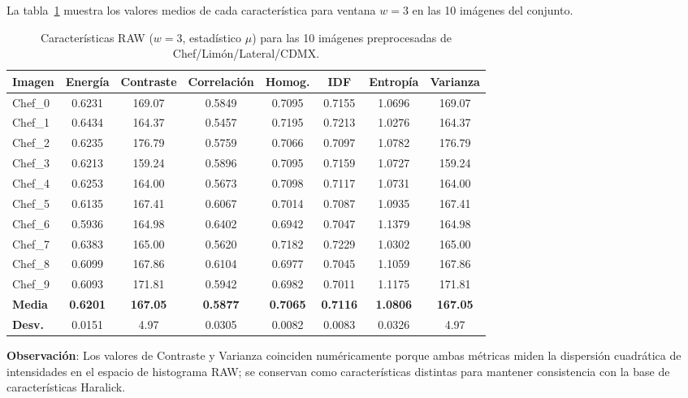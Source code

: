 \documentclass[12pt,a4paper]{article}
\begin{document}
La tabla~\ref{tab:raw_w3} muestra los valores medios de cada
característica para ventana $w=3$ en las 10 imágenes del conjunto.

\begin{table}[H]
\centering
\caption{Características RAW ($w=3$, estadístico $\mu$) para las
         10 imágenes preprocesadas de Chef/Limón/Lateral/CDMX.}
\label{tab:raw_w3}
\setlength{\tabcolsep}{5pt}
\begin{tabular}{@{}lccccccc@{}}
\toprule
\textbf{Imagen} & \textbf{Energía} & \textbf{Contraste} &
  \textbf{Correlación} & \textbf{Homog.} & \textbf{IDF} &
  \textbf{Entropía} & \textbf{Varianza} \\
\midrule
Chef\_0 & 0.6231 & 169.07 & 0.5849 & 0.7095 & 0.7155 & 1.0696 & 169.07 \\
Chef\_1 & 0.6434 & 164.37 & 0.5457 & 0.7195 & 0.7213 & 1.0276 & 164.37 \\
Chef\_2 & 0.6235 & 176.79 & 0.5759 & 0.7066 & 0.7097 & 1.0782 & 176.79 \\
Chef\_3 & 0.6213 & 159.24 & 0.5896 & 0.7095 & 0.7159 & 1.0727 & 159.24 \\
Chef\_4 & 0.6253 & 164.00 & 0.5673 & 0.7098 & 0.7117 & 1.0731 & 164.00 \\
Chef\_5 & 0.6135 & 167.41 & 0.6067 & 0.7014 & 0.7087 & 1.0935 & 167.41 \\
Chef\_6 & 0.5936 & 164.98 & 0.6402 & 0.6942 & 0.7047 & 1.1379 & 164.98 \\
Chef\_7 & 0.6383 & 165.00 & 0.5620 & 0.7182 & 0.7229 & 1.0302 & 165.00 \\
Chef\_8 & 0.6099 & 167.86 & 0.6104 & 0.6977 & 0.7045 & 1.1059 & 167.86 \\
Chef\_9 & 0.6093 & 171.81 & 0.5942 & 0.6982 & 0.7011 & 1.1175 & 171.81 \\
\midrule
\textbf{Media} & \textbf{0.6201} & \textbf{167.05} & \textbf{0.5877} &
  \textbf{0.7065} & \textbf{0.7116} & \textbf{1.0806} & \textbf{167.05} \\
\textbf{Desv.} & 0.0151 & 4.97 & 0.0305 & 0.0082 & 0.0083 & 0.0326 & 4.97 \\
\bottomrule
\end{tabular}
\end{table}

\noindent\textbf{Observación}: Los valores de Contraste y Varianza
coinciden numéricamente porque ambas métricas miden la dispersión
cuadrática de intensidades en el espacio de histograma RAW; se
conservan como características distintas para mantener consistencia
con la base de características Haralick.
\end{document}
